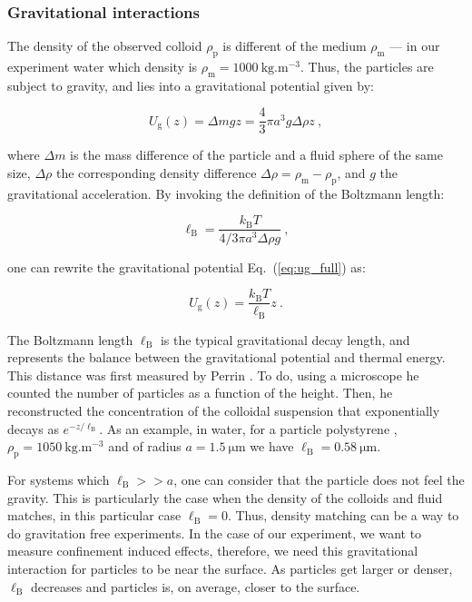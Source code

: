 \subsubsection{Gravitational interactions}


The density of the observed colloid $\rho_\mathrm{p}$ is different of the medium $\rho_\mathrm{m}$ --- in our experiment water which density is $\rho_\mathrm{m} = 1000 ~ \mathrm{kg.m^{-3}}$. Thus, the particles are subject to gravity, and lies into a gravitational potential given by:

\begin{equation}
	U_\mathrm{g} (z) = \Delta m g z = \frac{4}{3}\pi a ^3 g \Delta \rho z ~,
	\label{eq:ug_full}
\end{equation}

where $\Delta m$ is the mass difference of the particle and a fluid sphere of the same size, $\Delta \rho$ the corresponding density difference $\Delta \rho = \rho_\mathrm{m} - \rho_\mathrm{p} $, and $g$ the gravitational acceleration. By invoking the definition of the Boltzmann length:

\begin{equation}
	\ell _\mathrm{B} = \frac{k_\mathrm{B}T}{4/3 \pi a ^3 \Delta \rho g } ~,
\end{equation}

one can rewrite the gravitational potential Eq.~(\ref{eq:ug_full}) as:

\begin{equation}
	U_\mathrm{g}(z) = \frac{k_\mathrm{B}T}{\ell _\mathrm{B}}z ~.
	\label{eq:ug}
\end{equation}

The Boltzmann length $\ell_\mathrm{B}$ is the typical gravitational decay length, and represents the balance between the gravitational potential and thermal energy. This distance was first measured by Perrin \cite{perrin_les_2014}. To do, using a microscope he counted the number of particles as a function of the height. Then, he reconstructed the concentration of the colloidal suspension that exponentially decays as $e^{- z / \ell _\mathrm{B}}$. As an example, in water, for a particle polystyrene , $\rho _\mathrm{p} = 1050 ~ \mathrm{kg.m^{-3}}$ and of radius $a  = 1.5 ~ \mathrm{\mu m}$ we have $\ell _\mathrm{B} = 0.58 ~ \mathrm{\mu m}$.

For systems which $\ell _\mathrm{B} >> a $, one can consider that the particle does not feel the gravity. This is particularly the case when the density of the colloids and fluid matches, in this particular case $\ell _\mathrm{B} = 0$. Thus, density matching can be a way to do gravitation free experiments. In the case of our experiment, we want to measure confinement induced effects, therefore, we need this gravitational interaction for particles to be near the surface. As particles get larger or denser, $\ell _\mathrm{B}$ decreases and particles is, on average, closer to the surface. 


